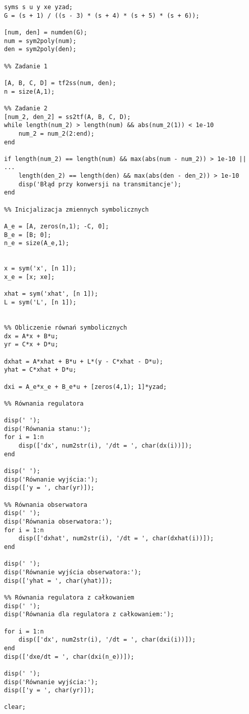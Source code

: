 \documentclass[a4paper,titlepage,11pt,floatssmall]{mwrep} %
\begin{document}
\begin{lstlisting}[style=custommatlab, caption={Pełny kod skryptu \texttt{equasions.m}.}, label={lst:equasions_full}]
%% Definicja transmitancji symbolicznej i konwersja na postać stanu
syms s u y xe yzad;
G = (s + 1) / ((s - 3) * (s + 4) * (s + 5) * (s + 6));

[num, den] = numden(G);
num = sym2poly(num);
den = sym2poly(den);

%% Zadanie 1

[A, B, C, D] = tf2ss(num, den);
n = size(A,1);

%% Zadanie 2
[num_2, den_2] = ss2tf(A, B, C, D);
while length(num_2) > length(num) && abs(num_2(1)) < 1e-10
    num_2 = num_2(2:end);
end

if length(num_2) == length(num) && max(abs(num - num_2)) > 1e-10 || ...
    length(den_2) == length(den) && max(abs(den - den_2)) > 1e-10
    disp('Błąd przy konwersji na transmitancje');
end

%% Inicjalizacja zmiennych symbolicznych

A_e = [A, zeros(n,1); -C, 0];
B_e = [B; 0];
n_e = size(A_e,1);


x = sym('x', [n 1]);
x_e = [x; xe];

xhat = sym('xhat', [n 1]);
L = sym('L', [n 1]);


%% Obliczenie równań symbolicznych
dx = A*x + B*u;
yr = C*x + D*u;

dxhat = A*xhat + B*u + L*(y - C*xhat - D*u);
yhat = C*xhat + D*u;

dxi = A_e*x_e + B_e*u + [zeros(4,1); 1]*yzad;

%% Równania regulatora

disp(' ');
disp('Równania stanu:');
for i = 1:n
    disp(['dx', num2str(i), '/dt = ', char(dx(i))]);
end

disp(' ');
disp('Równanie wyjścia:');
disp(['y = ', char(yr)]);

%% Równania obserwatora
disp(' ');
disp('Równania obserwatora:');
for i = 1:n
    disp(['dxhat', num2str(i), '/dt = ', char(dxhat(i))]);
end

disp(' ');
disp('Równanie wyjścia obserwatora:');
disp(['yhat = ', char(yhat)]);

%% Równania regulatora z całkowaniem
disp(' ');
disp('Równania dla regulatora z całkowaniem:');

for i = 1:n
    disp(['dx', num2str(i), '/dt = ', char(dxi(i))]);
end
disp(['dxe/dt = ', char(dxi(n_e))]);

disp(' ');
disp('Równanie wyjścia:');
disp(['y = ', char(yr)]);

clear;
\end{lstlisting}
\end{document}
